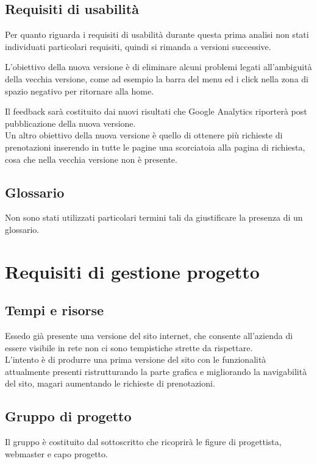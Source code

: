 \documentclass[a4paper,12pt,hidelinks]{report}
\begin{document}
\section{Requisiti di usabilità}
  Per quanto riguarda i requisiti di usabilità durante questa prima analisi non stati individuati particolari requisiti, quindi si rimanda a versioni successive. 
  \par L'obiettivo della nuova versione è di eliminare alcuni problemi legati all'ambiguità della vecchia versione, come ad esempio la barra del menu ed i click nella zona di spazio
  negativo per ritornare alla home. 
  \par Il feedback sarà costituito dai nuovi risultati che Google Analytics riporterà post pubblicazione della nuova versione.
  \\ Un altro obiettivo della nuova versione è quello di ottenere più richieste di prenotazioni inserendo in tutte le pagine una scorciatoia alla pagina di richiesta,
  cosa che nella vecchia versione non è presente.

\section{Glossario}
  Non sono stati utilizzati particolari termini tali da giustificare la presenza di un glossario.


\chapter{Requisiti di gestione progetto}

\section{Tempi e risorse}
  Essedo già presente una versione del sito internet, che consente all'azienda di essere visibile in rete non ci sono tempistiche strette da rispettare. 
  \\ L'intento è di produrre una prima versione del sito con le funzionalità attualmente presenti ristrutturando la parte grafica e migliorando la navigabilità del sito, 
  magari aumentando le richieste di prenotazioni.

\section{Gruppo di progetto}
  Il gruppo è costituito dal sottoscritto che ricoprirà le figure di progettista, webmaster e capo progetto.
\end{document}
